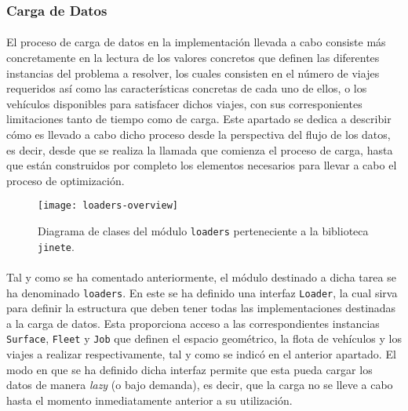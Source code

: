 \documentclass{subfiles}
\begin{document}
        \subsubsection{Carga de Datos}
        \label{sec:implementation_components_data_loading}

          \paragraph{}
          El proceso de carga de datos en la implementación llevada a cabo consiste más concretamente en la lectura de los valores concretos que definen las diferentes instancias del problema a resolver, los cuales consisten en el número de viajes requeridos así como las características concretas de cada uno de ellos, o los vehículos disponibles para satisfacer dichos viajes, con sus corresponientes limitaciones tanto de tiempo como de carga. Este apartado se dedica a describir cómo es llevado a cabo dicho proceso desde la perspectiva del flujo de los datos, es decir, desde que se realiza la llamada que comienza el proceso de carga, hasta que están construidos por completo los elementos necesarios para llevar a cabo el proceso de optimización.

          \begin{figure}[!ht]
            \centering
            \texttt{[image: loaders-overview]}
            \caption{Diagrama de clases del módulo \texttt{loaders} perteneciente a la biblioteca \texttt{jinete}.}
            \label{img:loaders_overview}
          \end{figure}

          \paragraph{}
          Tal y como se ha comentado anteriormente, el módulo destinado a dicha tarea se ha denominado \texttt{loaders}. En este se ha definido una interfaz \texttt{Loader}, la cual sirva para definir la estructura que deben tener todas las implementaciones destinadas a la carga de datos. Esta proporciona acceso a las correspondientes instancias \texttt{Surface}, \texttt{Fleet} y \texttt{Job} que definen el espacio geométrico, la flota de vehículos y los viajes a realizar respectivamente, tal y como se indicó en el anterior apartado. El modo en que se ha definido dicha interfaz permite que esta pueda cargar los datos de manera \emph{lazy} (o bajo demanda), es decir, que la carga no se lleve a cabo hasta el momento inmediatamente anterior a su utilización.
\end{document}
